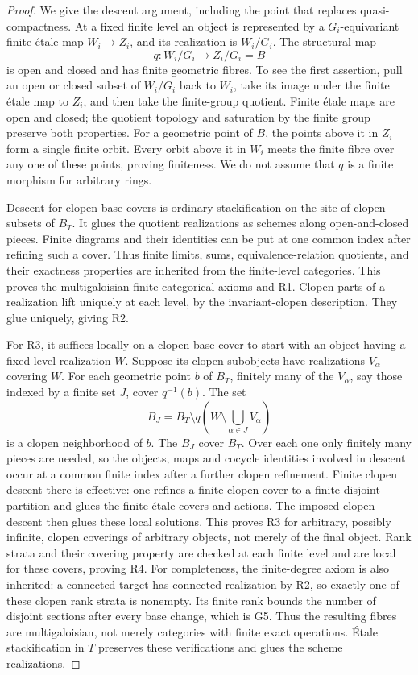 \begin{proof}
We give the descent argument, including the point that replaces
quasi-compactness. At a fixed finite level an object is represented
by a $G_i$-equivariant finite \'etale map $W_i\to Z_i$, and its
realization is $W_i/G_i$. The structural map
\[
 q:W_i/G_i\longrightarrow Z_i/G_i=B
\]
is open and closed and has finite geometric fibres. To see the
first assertion, pull an open or closed subset of $W_i/G_i$ back
to $W_i$, take its image under the finite \'etale map to $Z_i$,
and then take the finite-group quotient. Finite \'etale maps are
open and closed; the quotient topology and saturation by the finite
group preserve both properties. For a geometric point of $B$,
the points above it in $Z_i$ form a single finite orbit. Every
orbit above it in $W_i$ meets the finite fibre over any one of
these points, proving finiteness. We do not assume that $q$ is a
finite morphism for arbitrary rings.

Descent for clopen base covers is ordinary stackification on the
site of clopen subsets of $B_T$. It glues the quotient realizations
as schemes along open-and-closed pieces. Finite diagrams and their
identities can be put at one common index after refining such a
cover. Thus finite limits, sums, equivalence-relation quotients,
and their exactness properties are inherited from the finite-level
categories. This proves the multigaloisian finite categorical axioms
and R1. Clopen parts of a realization lift uniquely at each level,
by the invariant-clopen description. They glue uniquely, giving R2.

For R3, it suffices locally on a clopen base cover to start with an
object having a fixed-level realization $W$. Suppose its clopen
subobjects have realizations $V_\alpha$ covering $W$. For each
geometric point $b$ of $B_T$, finitely many of the $V_\alpha$,
say those indexed by a finite set $J$, cover $q^{-1}(b)$. The set
\[
 B_J=B_T\setminus q\left(W\setminus\bigcup_{\alpha\in J}
 V_\alpha\right)
\]
is a clopen neighborhood of $b$. The $B_J$ cover $B_T$. Over each
one only finitely many pieces are needed, so the objects, maps and
cocycle identities involved in descent occur at a common finite
index after a further clopen refinement. Finite clopen descent
there is effective: one refines a finite clopen cover to a finite
disjoint partition and glues the finite \'etale covers and actions.
The imposed clopen descent then glues these local solutions.
This proves R3 for arbitrary, possibly infinite, clopen coverings
of arbitrary objects, not merely of the final object. Rank strata
and their covering property are checked at each finite level and
are local for these covers, proving R4. For completeness, the
finite-degree axiom is also inherited: a connected target has
connected realization by R2, so exactly one of these clopen rank
strata is nonempty. Its finite rank bounds the number of disjoint
sections after every base change, which is G5. Thus the resulting
fibres are multigaloisian, not merely categories with finite exact
operations. \'Etale stackification in
$T$ preserves these verifications and glues the scheme realizations.


\end{proof}
